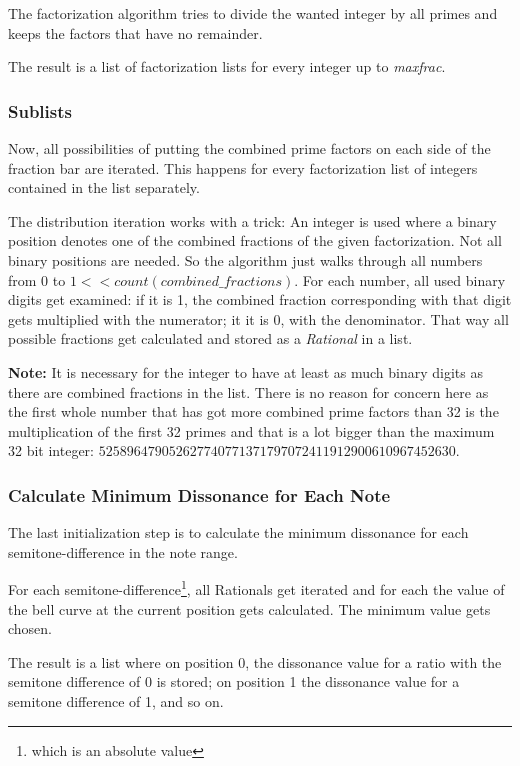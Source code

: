 \documentclass[12pt,a4paper,titlepage,oneside]{report}
\begin{document}
The factorization algorithm tries to divide the wanted integer by all primes and keeps the factors that have no remainder.

The result is a list of factorization lists for every integer up to \emph{maxfrac}.


\subsubsection{Sublists}

Now, all possibilities of putting the combined prime factors on each side of the fraction bar are iterated. This happens for every factorization list of integers contained in the list separately.

The distribution iteration works with a trick: An integer is used where a binary position denotes one of the combined fractions of the given factorization. Not all binary positions are needed. So the algorithm just walks through all numbers from 0 to $1 << count(combined\_fractions)$. For each number, all used binary digits get examined: if it is 1, the combined fraction corresponding with that digit gets multiplied with the numerator; it it is 0, with the denominator. That way all possible fractions get calculated and stored as a \emph{Rational} in a list.

\textbf{Note:} It is necessary for the integer to have at least as much binary digits as there are combined fractions in the list. There is no reason for concern here as the first whole number that has got more combined prime factors than 32 is the multiplication of the first 32 primes and that is a lot bigger than the maximum 32 bit integer: $525896479052627740771371797072411912900610967452630$.


\subsubsection{Calculate Minimum Dissonance for Each Note}

The last initialization step is to calculate the minimum dissonance for each semitone-difference in the note range.

For each semitone-difference\footnote{which is an absolute value}, all Rationals get iterated and for each the value of the bell curve at the current position gets calculated. The minimum value gets chosen.

The result is a list where on position 0, the dissonance value for a ratio with the semitone difference of 0 is stored; on position 1 the dissonance value for a semitone difference of 1, and so on.
\end{document}
